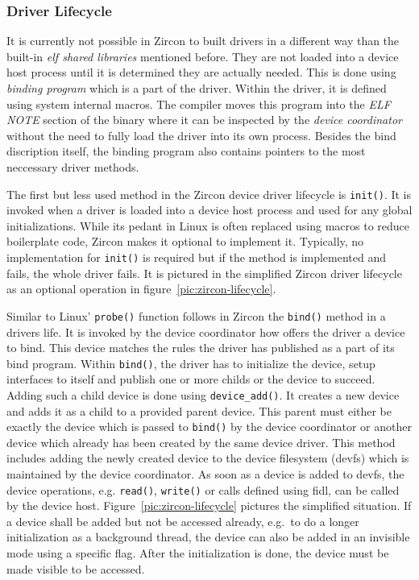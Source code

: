 \subsubsection*{Driver Lifecycle}
It is currently not possible in Zircon to built drivers in a different way than the built-in \textit{\ac{elf} shared libraries} mentioned before.
They are not loaded into a device host process until it is determined they are actually needed.
This is done using \textit{binding program} which is a part of the driver.
Within the driver, it is defined using system internal macros.
The compiler moves this program into the \textit{ELF NOTE} section of the binary where it can be inspected by the \textit{device coordinator} without the need to fully load the driver into its own process.
Besides the bind discription itself, the binding program also contains pointers to the most neccessary driver methods\cite{zircon-devicemodel}.

The first but less used method in the Zircon device driver lifecycle is \texttt{init()}.
It is invoked when a driver is loaded into a device host process and used for any global initializations.
While its pedant in Linux is often replaced using macros to reduce boilerplate code, Zircon makes it optional to implement it.
Typically, no implementation for \texttt{init()} is required but if the method is implemented and fails, the whole driver fails\cite{zircon-devicemodel}.
It is pictured in the simplified Zircon driver lifecycle as an optional operation in figure~\ref{pic:zircon-lifecycle}.

Similar to Linux' \texttt{probe()} function follows in Zircon the \texttt{bind()} method in a drivers life.
It is invoked by the device coordinator how offers the driver a device to bind.
This device matches the rules the driver has published as a part of its bind program.
Within \texttt{bind()}, the driver has to initialize the device, setup interfaces to itself and publish one or more childs or the device to succeed\cite{zircon-ddk-gettingstarted}.
Adding such a child device is done using \texttt{device\_add()}.
It creates a new device and adds it as a child to a provided parent device.
This parent must either be exactly the device which is passed to \texttt{bind()} by the device coordinator or another device which already has been created by the same device driver.
This method includes adding the newly created device to the device filesystem (devfs) which is maintained by the device coordinator.
As soon as a device is added to devfs, the device operations, e.g. \texttt{read()}, \texttt{write()} or calls defined using \ac{fidl}, can be called by the device host.
Figure~\ref{pic:zircon-lifecycle} pictures the simplified situation.
If a device shall be added but not be accessed already, e.g.\ to do a longer initialization as a background thread, the device can also be added in an invisible mode using a specific flag.
After the initialization is done, the device must be made visible to be accessed\cite{zircon-devicemodel}.

